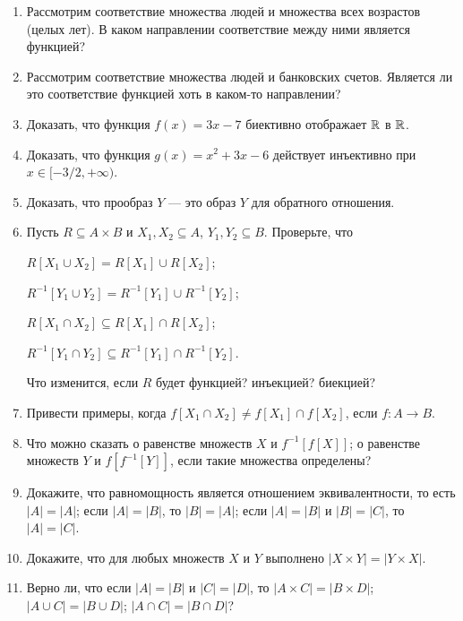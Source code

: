 \begin{enumerate}

\item Рассмотрим соответствие множества людей и множества всех возрастов (целых лет). В каком направлении соответствие между ними является функцией?
\item Рассмотрим соответствие множества людей и банковских счетов. Является ли это соответствие функцией хоть в каком-то направлении?
\item Доказать, что функция $f(x)=3x-7$ биективно отображает $\mathbb R$ в $\mathbb R$.
\item Доказать, что функция $g(x)=x^2+3x-6$ действует инъективно при $x\in[-3/2,+\infty)$.

\item Доказать, что прообраз $Y$ --- это образ $Y$ для обратного отношения.

\item Пусть $R\subseteq A\times B$ и $X_1,X_2\subseteq A$, $Y_1,Y_2\subseteq B$. Проверьте, что

\noindent\ipunkt $R[X_1\cup X_2] = R[X_1]\cup R[X_2]$;

\noindent\ipunkt $R^{-1}[Y_1\cup Y_2] = R^{-1}[Y_1]\cup R^{-1}[Y_2]$;

\noindent\ipunkt $R[X_1\cap X_2]\subseteq R[X_1]\cap R[X_2]$;

\noindent\ipunkt $R^{-1}[Y_1\cap Y_2]\subseteq R^{-1}[Y_1]\cap R^{-1}[Y_2]$.

Что изменится, если $R$ будет функцией? инъекцией? биекцией?

\item Привести примеры, когда $f[X_1\cap X_2]\ne f[X_1]\cap f[X_2]$, если $f:A\to B$.

\item Что можно сказать \ipunkt о равенстве множеств $X$ и $f^{-1}[f[X]]$; \ipunkt о равенстве множеств $Y$ и $f[f^{-1}[Y]]$, если такие множества определены?

\item Докажите, что равномощность является отношением эквивалентности, то есть
\ipunkt $|A| = |A|$;
\ipunkt если $|A| = |B|$, то $|B| = |A|$;
\ipunkt если $|A| = |B|$ и $|B| = |C|$, то $|A| = |C|$.

\item Докажите, что для любых множеств $X$ и $Y$ выполнено $|X \times Y | = |Y \times X|$.

\item Верно ли, что если $|A| = |B|$ и $|C| = |D|$, то
\ipunkt $|A \times C| = |B \times D|$;
\ipunkt $|A \cup C| = |B \cup D|$;
\ipunkt $|A \cap C| = |B \cap D|$?


\end{enumerate}
